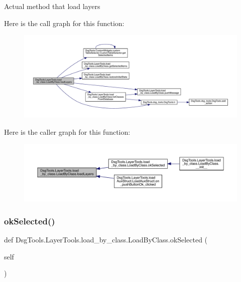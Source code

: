 \begin{DoxyVerb}Actual method that load layers
\end{DoxyVerb}
 Here is the call graph for this function\+:
\nopagebreak
\begin{figure}[H]
\begin{center}
\leavevmode
\includegraphics[width=350pt]{class_dsg_tools_1_1_layer_tools_1_1load__by__class_1_1_load_by_class_a1b632f61531a5ba993286a11b1b99345_cgraph}
\end{center}
\end{figure}
Here is the caller graph for this function\+:
\nopagebreak
\begin{figure}[H]
\begin{center}
\leavevmode
\includegraphics[width=350pt]{class_dsg_tools_1_1_layer_tools_1_1load__by__class_1_1_load_by_class_a1b632f61531a5ba993286a11b1b99345_icgraph}
\end{center}
\end{figure}
\mbox{\label{class_dsg_tools_1_1_layer_tools_1_1load__by__class_1_1_load_by_class_adc722a26fb632875f143b4dbf6544d36}} 
\subsubsection{\texorpdfstring{ok\+Selected()}{okSelected()}}
{\footnotesize\ttfamily def Dsg\+Tools.\+Layer\+Tools.\+load\+\_\+by\+\_\+class.\+Load\+By\+Class.\+ok\+Selected (\begin{DoxyParamCaption}\item[{}]{self }\end{DoxyParamCaption})}

